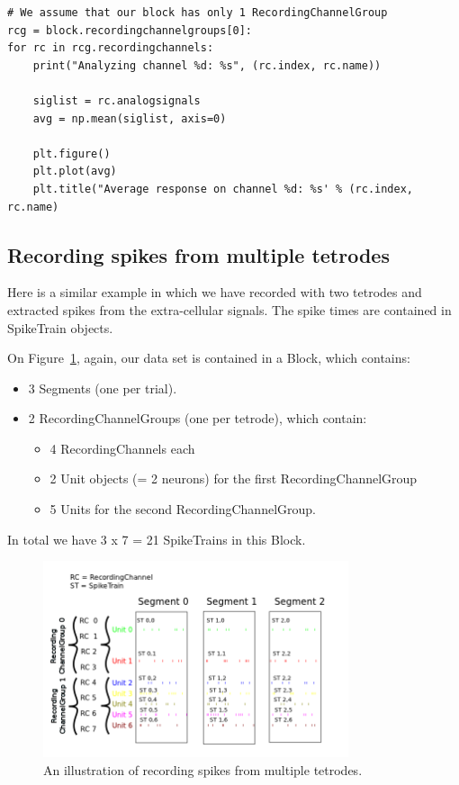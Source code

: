 \documentclass{frontiers}
\begin{document}
\begin{lstlisting}[style=display]
# We assume that our block has only 1 RecordingChannelGroup
rcg = block.recordingchannelgroups[0]:
for rc in rcg.recordingchannels:
    print("Analyzing channel %d: %s", (rc.index, rc.name))

    siglist = rc.analogsignals
    avg = np.mean(siglist, axis=0)

    plt.figure()
    plt.plot(avg)
    plt.title("Average response on channel %d: %s' % (rc.index, rc.name)
\end{lstlisting}


\subsection{Recording spikes from multiple tetrodes}

Here is a similar example in which we have recorded with two tetrodes and extracted spikes from the extra-cellular signals. The spike times are contained in SpikeTrain objects.

On Figure~\ref{fig:usecase2}, again, our data set is contained in a Block, which contains:

\begin{itemize}
\item 3 Segments (one per trial).
\item 2 RecordingChannelGroups (one per tetrode), which contain:
  \begin{itemize}
  \item 4 RecordingChannels each
  \item 2 Unit objects (= 2 neurons) for the first RecordingChannelGroup
  \item 5 Units for the second RecordingChannelGroup.
  \end{itemize}
\end{itemize}

In total we have 3 x 7 = 21 SpikeTrains in this Block.

\begin{figure}
\centering
\includegraphics[width=0.8\textwidth]{figures/usecase2}
\caption{An illustration of recording spikes from multiple tetrodes.}\label{fig:usecase2} 
\end{figure}
\end{document}
